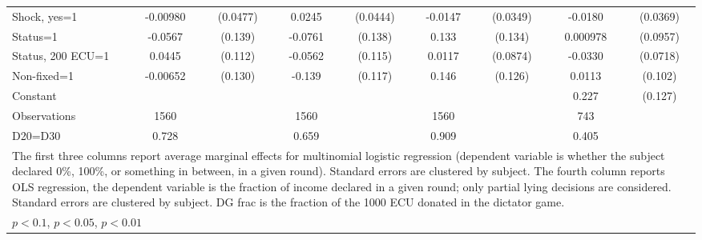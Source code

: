 \begin{tabular}{l|cccccc|cc}
Shock, yes=1    & -0.00980         & (0.0477)&   0.0245         & (0.0444)&  -0.0147         & (0.0349)&  -0.0180         & (0.0369)\\
Status=1        &  -0.0567         &  (0.139)&  -0.0761         &  (0.138)&    0.133         &  (0.134)& 0.000978         & (0.0957)\\
Status, 200 ECU=1&   0.0445         &  (0.112)&  -0.0562         &  (0.115)&   0.0117         & (0.0874)&  -0.0330         & (0.0718)\\
Non-fixed=1     & -0.00652         &  (0.130)&   -0.139         &  (0.117)&    0.146         &  (0.126)&   0.0113         &  (0.102)\\
Constant        &                  &         &                  &         &                  &         &    0.227\sym{*}  &  (0.127)\\
\hline
Observations    &     1560         &         &     1560         &         &     1560         &         &      743         &         \\
D20=D30         &    0.728         &         &    0.659         &         &    0.909         &         &    0.405         &         \\
\hline\hline
\multicolumn{9}{p{16cm}}{\tiny The first three columns report average marginal effects for multinomial logistic regression (dependent variable is whether the subject declared 0\%,  100\%, or something in between, in a given round). Standard errors are clustered by subject. The fourth column reports OLS regression, the dependent variable is the fraction of income declared in a given round; only partial lying decisions are considered. Standard errors are clustered by subject. DG frac is the fraction of the 1000 ECU donated in the dictator game.}\\
\multicolumn{9}{l}{\tiny \sym{*} \(p<0.1\), \sym{**} \(p<0.05\), \sym{***} \(p<0.01\)}\\
\end{tabular}